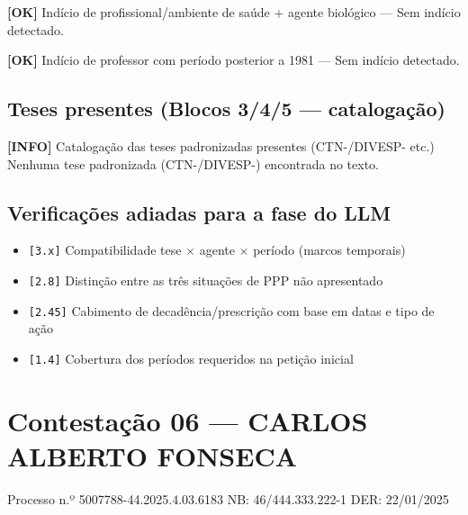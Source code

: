 \documentclass[12pt,a4paper]{article}
\newcommand{\statusOK}[1]{\textcolor{corOK}{\textbf{[OK]}} #1}
\newcommand{\statusINFO}[1]{\textcolor{corINFO}{\textbf{[INFO]}} #1}
\begin{document}
\medskip
\statusOK{Indício de profissional/ambiente de saúde + agente biológico} --- Sem indício detectado.

\medskip
\statusOK{Indício de professor com período posterior a 1981} --- Sem indício detectado.

\subsection{Teses presentes (Blocos 3/4/5 --- catalogação)}

\statusINFO{Catalogação das teses padronizadas presentes (CTN-/DIVESP- etc.)}\\
Nenhuma tese padronizada (CTN-/DIVESP-) encontrada no texto.

\subsection{Verificações adiadas para a fase do LLM}

\begin{itemize}
  \item \texttt{[3.x]} Compatibilidade tese × agente × período (marcos temporais)
  \item \texttt{[2.8]} Distinção entre as três situações de PPP não apresentado
  \item \texttt{[2.45]} Cabimento de decadência/prescrição com base em datas e tipo de ação
  \item \texttt{[1.4]} Cobertura dos períodos requeridos na petição inicial
\end{itemize}



\clearpage
{}
\section{Contestação 06 --- CARLOS ALBERTO FONSECA}
\begin{center}
  {\small Processo n.º 5007788-44.2025.4.03.6183 \quad NB: 46/444.333.222-1 \quad DER: 22/01/2025}
\end{center}
\end{document}
